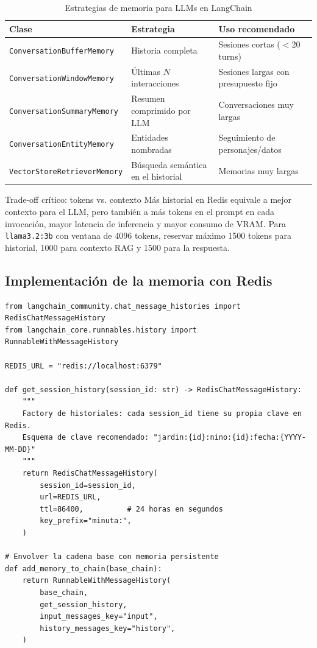 \documentclass[12pt,a4paper]{article}
\begin{document}
\begin{table}[H]
\centering
\caption{Estrategias de memoria para LLMs en LangChain}
\begin{tabular}{lll}
\toprule
\textbf{Clase} & \textbf{Estrategia} & \textbf{Uso recomendado} \\
\midrule
\texttt{ConversationBufferMemory} & Historia completa & Sesiones cortas ($<$20 turns) \\
\texttt{ConversationWindowMemory} & Últimas $N$ interacciones & Sesiones largas con presupuesto fijo \\
\texttt{ConversationSummaryMemory} & Resumen comprimido por LLM & Conversaciones muy largas \\
\texttt{ConversationEntityMemory} & Entidades nombradas & Seguimiento de personajes/datos \\
\texttt{VectorStoreRetrieverMemory} & Búsqueda semántica en el historial & Memorias muy largas \\
\bottomrule
\end{tabular}
\end{table}

\begin{warnbox}{Trade-off crítico: tokens vs. contexto}
Más historial en Redis equivale a mejor contexto para el LLM, pero también
a más tokens en el prompt en cada invocación, mayor latencia de inferencia
y mayor consumo de VRAM. Para \texttt{llama3.2:3b} con ventana de 4096 tokens,
reservar máximo 1500 tokens para historial, 1000 para contexto RAG y
1500 para la respuesta.
\end{warnbox}

\subsection{Implementación de la memoria con Redis}

\begin{lstlisting}[style=pythonstyle, caption={memory.py --- Memoria de sesión con Redis}]
from langchain_community.chat_message_histories import RedisChatMessageHistory
from langchain_core.runnables.history import RunnableWithMessageHistory

REDIS_URL = "redis://localhost:6379"

def get_session_history(session_id: str) -> RedisChatMessageHistory:
    """
    Factory de historiales: cada session_id tiene su propia clave en Redis.
    Esquema de clave recomendado: "jardin:{id}:nino:{id}:fecha:{YYYY-MM-DD}"
    """
    return RedisChatMessageHistory(
        session_id=session_id,
        url=REDIS_URL,
        ttl=86400,          # 24 horas en segundos
        key_prefix="minuta:",
    )

# Envolver la cadena base con memoria persistente
def add_memory_to_chain(base_chain):
    return RunnableWithMessageHistory(
        base_chain,
        get_session_history,
        input_messages_key="input",
        history_messages_key="history",
    )
\end{lstlisting}
\end{document}
